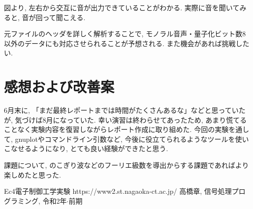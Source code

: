 \documentclass[titlepage]{jsarticle}
\begin{document}
    図より, 左右から交互に音が出力できていることがわかる.
    実際に音を聞いてみると, 音が回って聞こえる.

    元ファイルのヘッダを詳しく解析することで,
    モノラル音声・量子化ビット数8以外のデータにも対応させられることが予想される.
    また機会があれば挑戦したい.

\section{感想および改善案}
    6月末に, 「まだ最終レポートまでは時間がたくさんあるな」などと思っていたが,
    気づけば8月になっていた.
    幸い演習は終わらせてあったため, あまり慌てることなく実験内容を復習しながらレポート作成に取り組めた.
    今回の実験を通して, gnuplotやコマンドライン引数など, 今後に役立てられるようなツールを使いこなせるようになり,
    とても良い経験ができたと思う.

    課題について, のこぎり波などのフーリエ級数を導出からする課題であればより楽しめたと思った.

\begin{thebibliography}{99}
     Ec4電子制御工学実験 https://www2.st.nagaoka-ct.ac.jp/
     高橋章, 信号処理プログラミング, 令和2年$\cdot$前期
\end{thebibliography}
\end{document}
